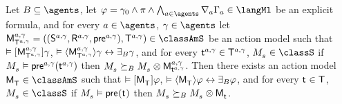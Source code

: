 \begin{lemma}\label{aaml-s5-covers}
Let $\agentsB \subseteq \agents$, 
let $\phi = \gamma_0 \land \pi \land \bigwedge_{\agentA \in \agents} \coverA \Gamma_\agentA \in \langMl$ be an explicit formula, and 
for every $\agentA \in \agents$, $\gamma \in \agents$
let $\aPModelAndTuple[\agentA, \gamma]{\aStatesT[\agentA, \gamma]} \in \classAmS$ be an action model such that 
$\entails \actionA{\aPModel[\agentA, \gamma]{\aStatesT[\agentA, \gamma]}} \gamma$,
$\entails \actionE{\aPModel[\agentA, \gamma]{\aStatesT[\agentA, \gamma]}} \gamma \iff \someactsBs \gamma$, and
for every $\aStateT[\agentA, \gamma] \in \aStatesT[\agentA, \gamma]$, $\kPModel{\kStateS} \in \classS$ if $\kPModel{\kStateS} \entails \aPrecondition[\agentA, \gamma](\aStateT[\agentA, \gamma])$ then $\kPModel{\kStateS} \simulatesBs \kPModel{\kStateS} \exec \aPModel[\agentA, \gamma]{\aStateT[\agentA, \gamma]}$.
Then there exists an action model $\aPModel{\aStatesT} \in \classAmS$ such that 
$\entails \actionA{\aPModel{\aStatesT}} \phi$,
$\entails \actionE{\aPModel{\aStatesT}} \phi \iff \someactsBs \phi$, and 
for every $\aStateT \in \aStatesT$, $\kPModel{\kStateS} \in \classS$ if $\kPModel{\kStateS} \entails \aPrecondition(\aStateT)$ then $\kPModel{\kStateS} \simulatesBs \kPModel{\kStateS} \exec \aPModel{\aStateT}$.
\end{lemma}

